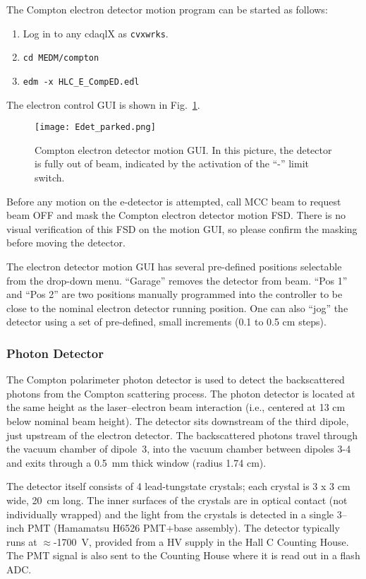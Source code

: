 {The Compton electron detector motion program can be started as follows:
\begin{enumerate}
    \item{Log in to any cdaqlX as \texttt{cvxwrks}.}
    \item{\texttt{cd MEDM/compton}}
    \item{\texttt{edm -x HLC\_E\_CompED.edl }}
\end{enumerate}
The electron control GUI is shown in Fig.~\ref{fig:edet_motion_gui}.


\begin{figure}[htb]
\begin{center}
\texttt{[image: Edet\_parked.png]}
\caption{Compton electron detector motion GUI. In this picture, the detector is fully out of beam,
indicated by the activation of the ``-'' limit switch.\label{fig:edet_motion_gui}}
\end{center}
\end{figure}

Before any motion on the e-detector is attempted, call MCC beam to request beam OFF and mask the Compton
electron detector motion FSD. There is no visual verification of this FSD on the motion GUI, so please
confirm the masking before moving the detector.

The electron detector motion GUI has several pre-defined positions selectable from the drop-down menu.
``Garage'' removes the detector from beam. ``Pos 1'' and ``Pos 2'' are two positions manually programmed
into the controller to be close to the nominal electron detector running position. One can also ``jog'' the
detector using a set of pre-defined, small increments (0.1 to 0.5 cm steps).


\subsubsection{Photon Detector}
The Compton polarimeter photon detector is used to detect the backscattered photons from the Compton
scattering process. The photon detector is located at the same height as the laser--electron beam interaction
(i.e., centered at 13 cm below nominal beam height). The detector sits downstream of the third dipole,
just upstream of the electron detector. The backscattered photons travel through the vacuum chamber of dipole~3,
into the vacuum chamber between dipoles 3-4 and exits through a 0.5~mm thick window (radius 1.74 cm).

The detector itself consists of 4 lead-tungstate crystals; each crystal is 3 x 3 cm wide, 20~cm long. The inner
surfaces of the crystals are in optical contact (not individually wrapped) and the light from the crystals is
detected in a single 3--inch PMT (Hamamatsu H6526 PMT+base assembly).  The detector typically runs at
$\approx$-1700~V, provided from a HV supply in the Hall C Counting House. The PMT signal is also sent to the Counting
House where it is read out in a flash ADC.

}
